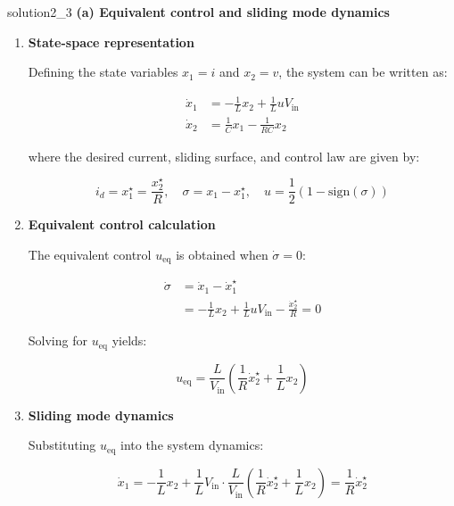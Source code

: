 \begin{solution}{}{solution2_3}
	\textbf{(a) Equivalent control and sliding mode dynamics}

	\begin{enumerate}
		\item \textbf{State-space representation}

		      Defining the state variables $x_1 = i$ and $x_2 = v$, the system can be written as:

		      $$
			      \begin{aligned}
				      \dot{x}_1 & = -\frac{1}{L}x_2 + \frac{1}{L}uV_{\text{in}} \\
				      \dot{x}_2 & = \frac{1}{C}x_1 - \frac{1}{RC}x_2
			      \end{aligned}
		      $$

		      where the desired current, sliding surface, and control law are given by:

		      $$
			      i_d = x_1^{\star} = \frac{x_2^{\star}}{R}, \quad \sigma = x_1 - x_1^{\star}, \quad u = \frac{1}{2}\left( 1 - \text{sign}(\sigma) \right)
		      $$

		\item \textbf{Equivalent control calculation}

		      The equivalent control $u_{\text{eq}}$ is obtained when $\dot{\sigma} = 0$:

		      $$
			      \begin{aligned}
				      \dot{\sigma} & = \dot{x}_1 - \dot{x}_1^{\star}                                                   \\
				                   & = -\frac{1}{L}x_2 + \frac{1}{L} u V_{\text{in}} - \frac{\dot{x}_2^{\star}}{R} = 0
			      \end{aligned}
		      $$

		      Solving for $u_{\text{eq}}$ yields:

		      $$
			      u_{\text{eq}} = \frac{L}{V_{\text{in}}} \left( \frac{1}{R}\dot{x}_2^{\star} + \frac{1}{L}x_2 \right)
		      $$

		\item \textbf{Sliding mode dynamics}

		      Substituting $u_{\text{eq}}$ into the system dynamics:

		      $$
			      \dot{x}_1 = -\frac{1}{L}x_2 + \frac{1}{L}V_{\text{in}} \cdot \frac{L}{V_{\text{in}}} \left( \frac{1}{R}\dot{x}_2^{\star} + \frac{1}{L}x_2 \right) = \frac{1}{R}\dot{x}_2^{\star}
		      $$


\end{enumerate}
\end{solution}
